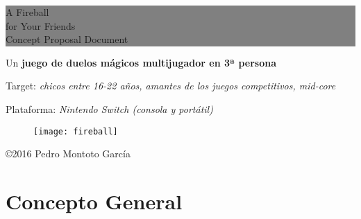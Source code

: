 \documentclass[12pt]{article}
\begin{document}
\pagestyle{empty} %


\colorbox{grey}{
	\parbox[t]{1.0\linewidth}{
		\fontsize{50pt}{30pt}\selectfont %
		\vspace*{0.7cm} %
		
		A Fireball \\ 
		for Your Friends \\ 
        \fontsize{30pt}{34pt}\selectfont
        Concept Proposal Document		
		\par
		
		\vspace*{0.4cm} %
	}
}

\vspace*{0.4cm} 
{\large Un \textbf{juego de duelos mágicos multijugador en 3ª persona}}

\begin{spacing}{0.6}
Target: \textit{chicos entre 16-22 años, amantes de los juegos competitivos, mid-core} 

Plataforma: \textit{Nintendo Switch (consola y portátil)}
\end{spacing}


\begin{figure}[h]
    \centering
    \texttt{[image: fireball]}
\end{figure}

\vfill %

{\centering \hfill \copyright 2016 Pedro Montoto García} \\


\cleardoublepage

\setlength{\voffset}{0cm}
\setlength{\parindent}{1cm}

\section{Concepto General}
\pagestyle{fancy}
\setcounter{page}{1}
\end{document}
